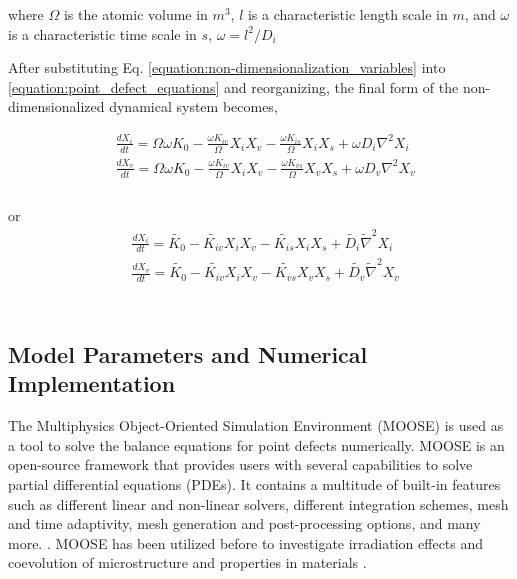 \documentclass[utf8]{frontiersSCNS} %
\begin{document}
    where ${\Omega}$ is the atomic volume in ${m^3}$, ${l}$ is a characteristic length scale in ${m}$, and ${\omega}$ is a characteristic time scale in ${s}$, ${\omega= l^2/D_i}$
    
    After substituting Eq. \ref{equation:non-dimensionalization_variables} into \ref{equation:point_defect_equations} and reorganizing, the final form  of the non-dimensionalized dynamical system becomes,

    \begin{equation}
      \begin{aligned}
        &\frac{dX_i}{dt} = \Omega\omega K_0 - \frac{\omega K_{iv}}{\Omega}X_iX_v - \frac{\omega K_{is}}{\Omega}X_iX_s + \omega D_i\nabla^2 X_i\\
        &\frac{dX_v}{dt} = \Omega\omega K_0 - \frac{\omega K_{iv}}{\Omega}X_iX_v - \frac{\omega K_{vs}}{\Omega}X_vX_s + \omega D_v\nabla^2 X_v\\
      \end{aligned}
      \label{equation:non-dimensionalized_point_defect_equations}
    \end{equation}\\
    or
    \begin{equation}
      \begin{aligned}
        &\frac{dX_i}{dt} = \widetilde{K_0} - \widetilde{K_{iv}}X_iX_v - \widetilde{K_{is}}X_iX_s + \widetilde{D_i}\widetilde{\nabla}^2 X_i\\
        &\frac{dX_v}{dt} = \widetilde{K_0} - \widetilde{K_{iv}}X_iX_v - \widetilde{K_{vs}}X_vX_s + \widetilde{D_v}\widetilde{\nabla}^2 X_v\\
      \end{aligned}
      \label{equation:non-dimensionalized_point_defect_equations}
    \end{equation}\\

\subsection{Model Parameters and Numerical Implementation}
    The Multiphysics Object-Oriented Simulation Environment (MOOSE) is used as a tool to solve the balance equations for point defects numerically. MOOSE is an open-source framework that provides users with several capabilities to solve partial differential equations (PDEs). It contains a multitude of built-in features such as different linear and non-linear solvers, different integration schemes, mesh and time adaptivity, mesh generation and post-processing options, and many more. \citep{permann2020}. MOOSE has been utilized before to investigate irradiation effects and coevolution of microstructure and properties in materials \citep{ahmed2020,tonks2018,ahmed2018,abdoelatef2019,badry2019}.
    
\end{document}
